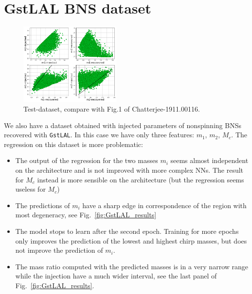 \documentclass[prd,aps,twocolumn,a4paper,showkeys,nofootinbib]{revtex4-1}
\begin{document}
\section{GstLAL BNS dataset}
\label{sec:GstLAL}
\begin{figure}[]
  \center
  \includegraphics[width=0.45\textwidth]{./Figs/GstLAL_paperlike_m1m2.png}
  \caption{\label{fig:GstLAL_paperlike} Test-dataset, compare with Fig.1 of Chatterjee-1911.00116.}
\end{figure}

We also have a dataset obtained with injected parameters of nonspinning 
BNSs recovered with \texttt{GstLAL}.
In this case we have only three features: $m_1$, $m_2$, $M_c$.
The regression on this dataset is more problematic:
\begin{itemize}
\item The output of the regression for the two masses $m_i$ seems almost independent on the 
architecture and is not improved with more complex NNs. The result for $M_c$ instead is 
more sensible on the architecture (but the regression seems useless for $M_c$)

\item The predictions of $m_i$ have a sharp edge in correspondence of the region with 
most degeneracy, see Fig.~\ref{fig:GstLAL_results}

\item The model stops to learn after the second epoch. Training for more epochs only improves
the prediction of the lowest and highest chirp masses, but does not improve the prediction
of $m_i$. 

\item The mass ratio computed with the predicted masses is in a very narrow range while
the injection have a much wider interval, see the last panel of Fig.~\ref{fig:GstLAL_results}.

\end{itemize} 
\end{document}
